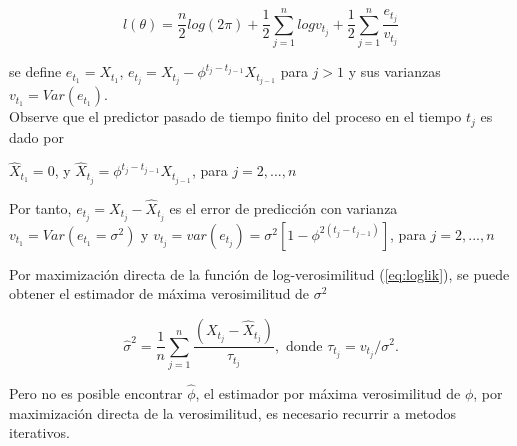 \begin{equation}
	l(\theta) = \frac{n}{2}log(2\pi) + \frac{1}{2}\sum_{j=1}^{n} log v_{t_j} +  \frac{1}{2}\sum_{j=1}^{n}\frac{e_{t_j}}{v_{t_j}}
	\label{eq:loglik}
\end{equation}

se define $e_{t_1} = X_{t_1}$, $e_{t_j} = X_{t_j}-\phi^{t_j-t_{j-1}}X_{t_{j-1}}$ para $j>1$ y sus varianzas $v_{t_1} = Var(e_{t_1}) $.\\

Observe que el predictor pasado de tiempo finito del proceso en el tiempo $t_j$ es dado por 

$\hat{X}_{t_1} = 0$, y $\hat{X}_{t_j} = \phi^{t_j - t_{j-1}} X_{t_{j-1}}$, para $j = 2, ... , n$ 

Por tanto, $e_{t_j} = X_{t_j} - \hat{X}_{t_j}$ es el error de predicción con varianza $v_{t_1} = Var(e_{t_1} = \sigma^2)$ y
$v_{t_j} = var(e_{t_j}) = \sigma^2[1 - \phi^{2(t_j - t_{j-1})}]$, para $j = 2, ... , n$ 

Por maximización directa de la función de log-verosimilitud (\ref{eq:loglik}), se puede obtener el estimador de máxima verosimilitud de $\sigma^2$

\begin{equation}
	\hat{\sigma}^2 = \frac{1}{n} \sum_{j=1}^{n} \frac{\left(X_{t_j} - \hat{X}_{t_j}\right)}{\tau_{t_j}}, \text{ donde } \tau_{t_j} = v_{t_j}/\sigma^2.
\end{equation}

Pero no es posible encontrar $\hat{\phi}$, el estimador por máxima verosimilitud de $\phi$, por maximización directa de la verosimilitud, es necesario
recurrir a metodos iterativos. 






